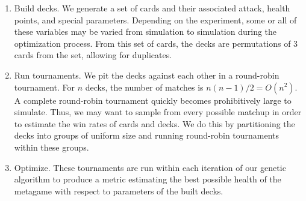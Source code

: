 \begin{enumerate}
	\item Build decks. We generate a set of cards and their associated attack, health points, and special parameters.
	Depending on the experiment, some or all of these variables may be varied from simulation to simulation during the optimization process.
	From this set of cards, the decks are permutations of 3 cards from the set, allowing for duplicates.
	\item Run tournaments. We pit the decks against each other in a round-robin tournament. For $n$ decks,
	the number of matches is $n(n-1)/2 = O(n^2)$. A complete round-robin tournament quickly becomes prohibitively large to simulate.
	Thus, we may want to sample from every possible matchup in order to estimate the win rates of cards and decks. We do this by 
	partitioning the decks into groups of uniform size and running round-robin tournaments within these groups.
	\item Optimize. These tournaments are run within each iteration of our genetic algorithm to produce a metric estimating the best
	possible health of the metagame with respect to parameters of the built decks.
\end{enumerate}
